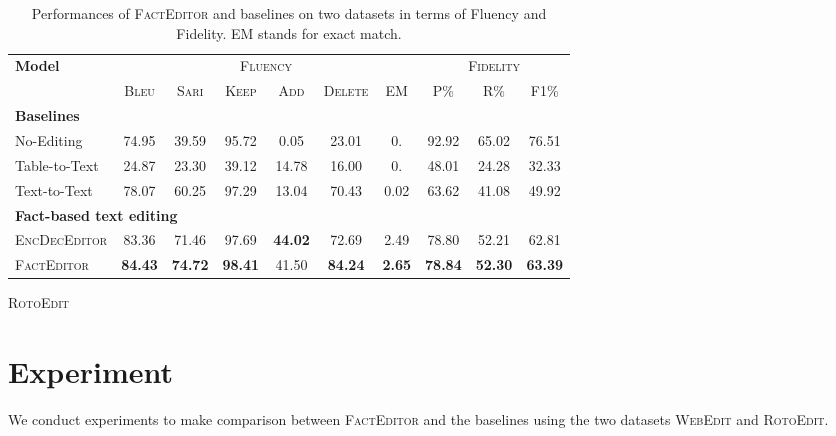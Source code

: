 \documentclass[11pt,a4paper]{article}
\begin{document}
\begin{table*}[t]
    \newline
    \vspace*{1em}
    \newline
    \begin{subtable}[t]{\textwidth}
        \centering
        \small
        \begin{tabular}{l|c|cccc|c|ccc}
            \toprule
            \multirow{2}{*}{\textbf{Model}} &  \multicolumn{6}{c|}{\textsc{Fluency}} &  \multicolumn{3}{c}{\textsc{Fidelity}} \\
            &\textsc{Bleu} & \textsc{Sari} & \textsc{Keep} & \textsc{Add} & \textsc{Delete} & \textsc{EM} & P\% & R\% & F1\%\\
            \midrule
            \multicolumn{10}{l}{\textbf{Baselines}}\\
            No-Editing              & 74.95 & 39.59 & 95.72 & 0.05 & 23.01 & 0. & 92.92 & 65.02 & 76.51\\
            Table-to-Text      & 24.87 & 23.30 & 39.12 & 14.78 & 16.00 & 0. & 48.01 & 24.28 & 32.33 \\
            Text-to-Text       & 78.07 & 60.25 & 97.29 & 13.04 & 70.43 & 0.02 & 63.62 & 41.08 & 49.92\\
            \midrule
            \multicolumn{10}{l}{\textbf{Fact-based text editing}}\\
            \textsc{EncDecEditor} & 83.36 & 71.46 & 97.69 & \textbf{44.02} & 72.69 & 2.49 & 78.80 & 52.21 & 62.81\\
            \textsc{FactEditor} & \textbf{84.43} & \textbf{74.72} & \textbf{98.41} & 41.50 & \textbf{84.24} & \textbf{2.65} & \textbf{78.84} & \textbf{52.30} & \textbf{63.39}\\
            \bottomrule
        \end{tabular}
        \caption{\textsc{RotoEdit}}
        \label{tab:Experiment_rotoedit}
    \end{subtable}
    \caption{Performances of \textsc{FactEditor} and baselines on two datasets in terms of Fluency and Fidelity. \textsc{EM} stands for exact match.}
    \label{tab:main_results}
\end{table*}

\section{Experiment}

We conduct experiments to make comparison between \textsc{FactEditor} and the baselines using the two datasets \textsc{WebEdit} and \textsc{RotoEdit}.
\end{document}
